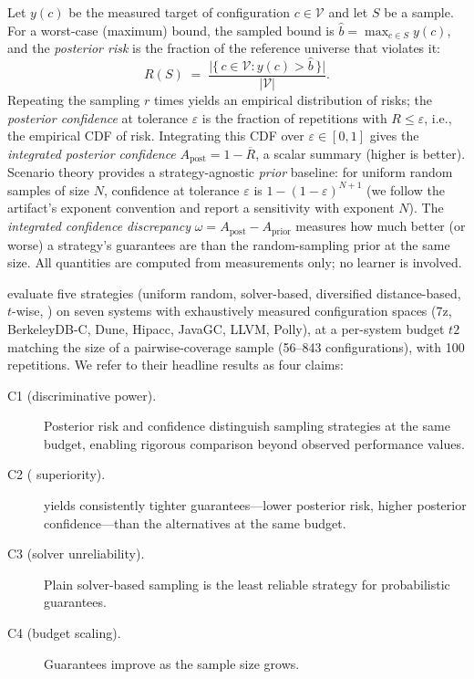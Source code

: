 Let $y(c)$ be the measured target of configuration $c \in \mathcal{V}$
and let $S$ be a sample. For a worst-case (maximum) bound, the sampled
bound is $\hat{b} = \max_{c \in S} y(c)$, and the \emph{posterior risk}
is the fraction of the reference universe that violates it:
\begin{equation}
  R(S) \;=\; \frac{\big|\{\,c \in \mathcal{V} : y(c) > \hat{b}\,\}\big|}{|\mathcal{V}|}.
  \label{eq:risk}
\end{equation}
Repeating the sampling $r$ times yields an empirical distribution of
risks; the \emph{posterior confidence} at tolerance $\varepsilon$ is the
fraction of repetitions with $R \le \varepsilon$, i.e., the empirical CDF
of risk. Integrating this CDF over $\varepsilon \in [0,1]$ gives the
\emph{integrated posterior confidence} $A_{\mathrm{post}} = 1 -
\overline{R}$, a scalar summary (higher is better). Scenario theory
provides a strategy-agnostic \emph{prior} baseline: for uniform random
samples of size $N$, confidence at tolerance $\varepsilon$ is
$1-(1-\varepsilon)^{N+1}$ (we follow the artifact's exponent convention
and report a sensitivity with exponent $N$). The \emph{integrated
confidence discrepancy} $\omega = A_{\mathrm{post}} - A_{\mathrm{prior}}$
measures how much better (or worse) a strategy's guarantees are than the
random-sampling prior at the same size. All quantities are computed from
measurements only; no learner is involved.

\citet{weis2026risk} evaluate five strategies (uniform random,
solver-based, diversified distance-based, $t$-wise, \srs) on seven
systems with exhaustively measured configuration spaces (7z, BerkeleyDB-C,
Dune, Hipacc, JavaGC, LLVM, Polly), at a per-system budget $t2$ matching
the size of a pairwise-coverage sample (56--843 configurations), with 100
repetitions. We refer to their headline results as four claims:

\begin{description}
\item[C1 (discriminative power).] Posterior risk and confidence
  distinguish sampling strategies at the same budget, enabling rigorous
  comparison beyond observed performance values.
\item[C2 (\srs{} superiority).] \srs{} yields consistently tighter
  guarantees---lower posterior risk, higher posterior confidence---than
  the alternatives at the same budget.
\item[C3 (solver unreliability).] Plain solver-based sampling is the
  least reliable strategy for probabilistic guarantees.
\item[C4 (budget scaling).] Guarantees improve as the sample size grows.
\end{description}

